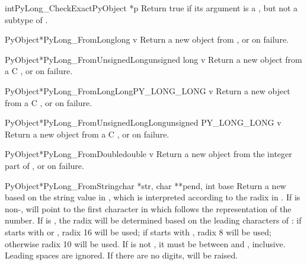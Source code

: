 \begin{cfuncdesc}{int}{PyLong_CheckExact}{PyObject *p}
  Return true if its argument is a , but not a
  subtype of .
\end{cfuncdesc}

\begin{cfuncdesc}{PyObject*}{PyLong_FromLong}{long v}
  Return a new  object from , or \NULL{}
  on failure.
\end{cfuncdesc}

\begin{cfuncdesc}{PyObject*}{PyLong_FromUnsignedLong}{unsigned long v}
  Return a new  object from a C , or \NULL{} on failure.
\end{cfuncdesc}

\begin{cfuncdesc}{PyObject*}{PyLong_FromLongLong}{PY_LONG_LONG v}
  Return a new  object from a C ,
  or \NULL{} on failure.
\end{cfuncdesc}

\begin{cfuncdesc}{PyObject*}{PyLong_FromUnsignedLongLong}{unsigned PY_LONG_LONG v}
  Return a new  object from a C , or \NULL{} on failure.
\end{cfuncdesc}

\begin{cfuncdesc}{PyObject*}{PyLong_FromDouble}{double v}
  Return a new  object from the integer part of
  , or \NULL{} on failure.
\end{cfuncdesc}

\begin{cfuncdesc}{PyObject*}{PyLong_FromString}{char *str, char **pend,
                                                int base}
  Return a new  based on the string value in
  , which is interpreted according to the radix in
  .  If  is non-\NULL{},  will
  point to the first character in  which follows the
  representation of the number.  If  is , the radix
  will be determined based on the leading characters of : if
   starts with  or , radix 16 will be
  used; if  starts with , radix 8 will be used;
  otherwise radix 10 will be used.  If  is not , it
  must be between  and , inclusive.  Leading spaces
  are ignored.  If there are no digits,  will be
  raised.
\end{cfuncdesc}

